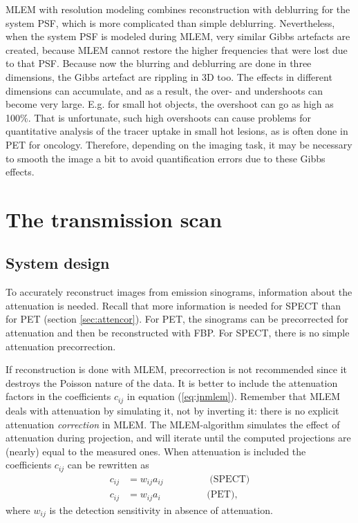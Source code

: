 \documentclass[11pt,oneside]{article}
\begin{document}
MLEM with resolution modeling combines reconstruction with deblurring
for the system PSF, which is more complicated than simple
deblurring. Nevertheless, when the system PSF is modeled during MLEM,
very similar Gibbs artefacts are created, because MLEM cannot restore
the higher frequencies that were lost due to that PSF. Because now the
blurring and deblurring are done in three dimensions, the Gibbs
artefact are rippling in 3D too. The effects in different dimensions
can accumulate, and as a result, the over- and undershoots can become
very large. E.g. for small hot objects, the overshoot can go as high
as 100\%. That is unfortunate, such high overshoots can cause problems
for quantitative analysis of the tracer uptake in small hot lesions,
as is often done in PET for oncology. Therefore, depending on the
imaging task, it may be necessary to smooth the image a bit to avoid
quantification errors due to these Gibbs effects.

\section{The transmission scan} \label{ch:trans}


\subsection{System design}
To accurately reconstruct images from emission sinograms, information about
the attenuation is needed. Recall that more information is needed for SPECT
than for PET (section \ref{sec:attencor}). For PET, the
sinograms can be precorrected for attenuation and then be reconstructed with
FBP. For SPECT, there is no simple attenuation precorrection.

If reconstruction is done with MLEM, precorrection is not recommended since it
destroys the Poisson nature of the data. It is better to include the
attenuation factors in the coefficients $c_{ij}$ in equation
(\ref{eq:jnmlem}). Remember that MLEM deals with attenuation by simulating it,
not by inverting it: there is no explicit attenuation {\em correction} in
MLEM. The MLEM-algorithm simulates the effect of attenuation during
projection, and will iterate until the computed projections are (nearly) equal
to the measured ones. When attenuation is included the coefficients $c_{ij}$
can be rewritten as
\begin{align}
  c_{ij} &= w_{ij} a_{ij} \hspace{2cm} \mbox{(SPECT)}\\
  c_{ij} &= w_{ij} a_{i}  \hspace{2cm} \mbox{(PET)},
\end{align}
where $w_{ij}$ is the detection sensitivity in absence of attenuation.
\end{document}
